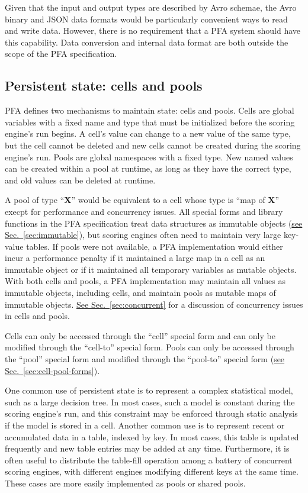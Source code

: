 \documentclass{article}
\newcommand{\PFAtp}{\ttfamily\bfseries}
\theoremstyle{definition}
\begin{document}
Given that the input and output types are described by Avro schemae, the Avro binary and JSON data formats would be particularly convenient ways to read and write data.  However, there is no requirement that a PFA system should have this capability.  Data conversion and internal data format are both outside the scope of the PFA specification.

\hypertarget{hsec:state}{}
\subsection{Persistent state: cells and pools}
\label{sec:state}

PFA defines two mechanisms to maintain state: cells and pools.  Cells are global variables with a fixed name and type that must be initialized before the scoring engine's run begins.  A cell's value can change to a new value of the same type, but the cell cannot be deleted and new cells cannot be created during the scoring engine's run.  Pools are global namespaces with a fixed type.  New named values can be created within a pool at runtime, as long as they have the correct type, and old values can be deleted at runtime.

A pool of type ``{\PFAtp X}'' would be equivalent to a cell whose type is ``map of {\PFAtp X}'' execpt for performance and concurrency issues.  All special forms and library functions in the PFA specification treat data structures as immutable objects (\hyperlink{hsec:immutable}{see Sec.~\ref{sec:immutable}}), but scoring engines often need to maintain very large key-value tables.  If pools were not available, a PFA implementation would either incur a performance penalty if it maintained a large map in a cell as an immutable object or if it maintained all temporary variables as mutable objects.  With both cells and pools, a PFA implementation may maintain all values as immutable objects, including cells, and maintain pools as mutable maps of immutable objects.  \hyperlink{hsec:concurrent}{See Sec.~\ref{sec:concurrent}} for a discussion of concurrency issues in cells and pools.

Cells can only be accessed through the ``cell'' special form and can only be modified through the ``cell-to'' special form.  Pools can only be accessed through the ``pool'' special form and modified through the ``pool-to'' special form (\hyperlink{hsec:cell-pool-forms}{see Sec.~\ref{sec:cell-pool-forms}}).

One common use of persistent state is to represent a complex statistical model, such as a large decision tree.  In most cases, such a model is constant during the scoring engine's run, and this constraint may be enforced through static analysis if the model is stored in a cell.  Another common use is to represent recent or accumulated data in a table, indexed by key.  In most cases, this table is updated frequently and new table entries may be added at any time.  Furthermore, it is often useful to distribute the table-fill operation among a battery of concurrent scoring engines, with different engines modifying different keys at the same time.  These cases are more easily implemented as pools or shared pools.
\end{document}
